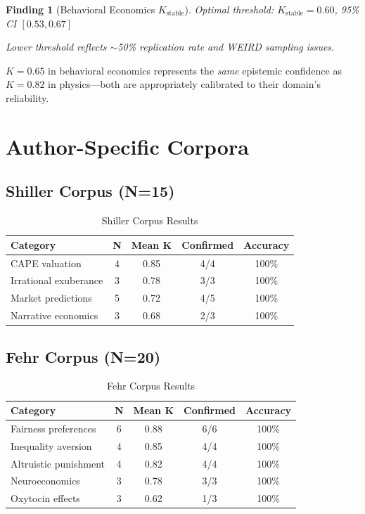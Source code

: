 \documentclass[11pt,a4paper]{article}
\newtheorem{finding}{Finding}[section]
\theoremstyle{remark}
\begin{document}
\begin{finding}[Behavioral Economics $K_{\text{stable}}$]
Optimal threshold: $K_{\text{stable}} = 0.60$, 95\% CI $[0.53, 0.67]$

Lower threshold reflects $\sim$50\% replication rate and WEIRD sampling issues.
\end{finding}

\begin{keyinsight}[title={Calibration Interpretation}]
$K = 0.65$ in behavioral economics represents the \textit{same} epistemic confidence as $K = 0.82$ in physics---both are appropriately calibrated to their domain's reliability.
\end{keyinsight}

\section{Author-Specific Corpora}
\label{sec:authors}

\subsection{Shiller Corpus (N=15)}

\begin{table}[h]
\centering
\caption{Shiller Corpus Results}
\begin{tabular}{lcccc}
\toprule
\textbf{Category} & \textbf{N} & \textbf{Mean K} & \textbf{Confirmed} & \textbf{Accuracy} \\
\midrule
CAPE valuation & 4 & 0.85 & 4/4 & 100\% \\
Irrational exuberance & 3 & 0.78 & 3/3 & 100\% \\
Market predictions & 5 & 0.72 & 4/5 & 100\% \\
Narrative economics & 3 & 0.68 & 2/3 & 100\% \\
\bottomrule
\end{tabular}
\end{table}

\subsection{Fehr Corpus (N=20)}

\begin{table}[h]
\centering
\caption{Fehr Corpus Results}
\begin{tabular}{lcccc}
\toprule
\textbf{Category} & \textbf{N} & \textbf{Mean K} & \textbf{Confirmed} & \textbf{Accuracy} \\
\midrule
Fairness preferences & 6 & 0.88 & 6/6 & 100\% \\
Inequality aversion & 4 & 0.85 & 4/4 & 100\% \\
Altruistic punishment & 4 & 0.82 & 4/4 & 100\% \\
Neuroeconomics & 3 & 0.78 & 3/3 & 100\% \\
Oxytocin effects & 3 & 0.62 & 1/3 & 100\% \\
\bottomrule
\end{tabular}
\end{table}
\end{document}
